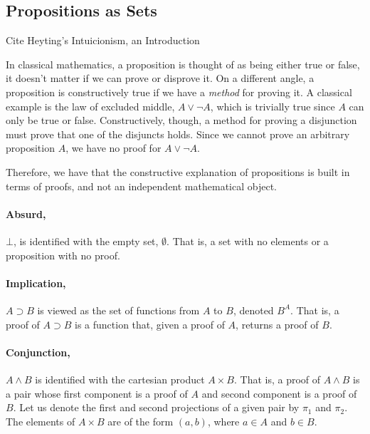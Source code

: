\subsection{Propositions as Sets}
\label{subsec:martinlof:propositionsassets}

\begin{TODO}
  \item Cite Heyting's Intuicionism, an Introduction
\end{TODO}

In classical mathematics, a proposition is thought of as being either true or false, it doesn't
matter if we can prove or disprove it. On a different angle, a proposition is constructively true
if we have a \emph{method} for proving it. A classical example is the law of excluded middle, $A \vee \neg A$,
which is trivially true since $A$ can only be true or false. Constructively, though, a method for proving a disjunction
must prove that one of the disjuncts holds. Since we cannot prove an arbitrary proposition $A$, we have
no proof for $A \vee \neg A$. 

Therefore, we have that the constructive explanation of propositions is built in terms of proofs, and
not an independent mathematical object. 

\paragraph{Absurd,} $\bot$, is identified with the empty set, $\emptyset$. That is, a set with no elements
or a proposition with no proof.

\paragraph{Implication,} $A \supset B$ is viewed as the set of functions from $A$ to $B$, denoted $B^A$. That is,
a proof of $A \supset B$ is a function that, given a proof of $A$, returns a proof of $B$.

\newcommand{\pone}{\pi_1}
\newcommand{\ptwo}{\pi_2}
\paragraph{Conjunction,} $A \wedge B$ is identified with the cartesian product $A \times B$. That is, a proof
of $A \wedge B$ is a pair whose first component is a proof of $A$ and second component is a proof of $B$.
Let us denote the first and second projections of a given pair by $\pone$ and $\ptwo$.
The elements of $A \times B$ are of the form $(a, b)$, where $a \in A$ and $b \in B$.

